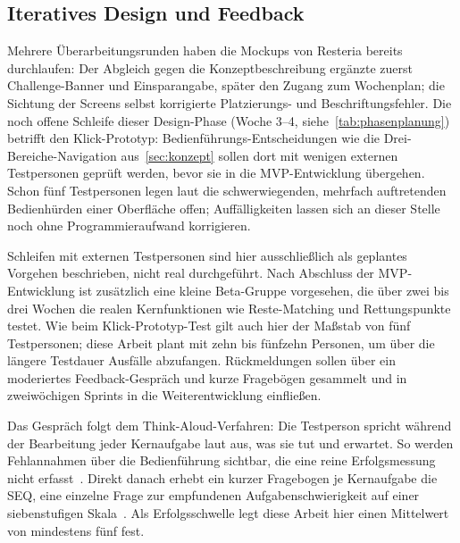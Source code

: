 \subsection{Iteratives Design und Feedback}\label{sec:iteratives_design}

Mehrere Überarbeitungsrunden haben die Mockups von Resteria bereits durchlaufen: Der Abgleich gegen die Konzeptbeschreibung ergänzte zuerst Challenge-Banner und Einsparangabe, später den Zugang zum Wochenplan; die Sichtung der Screens selbst korrigierte Platzierungs- und Beschriftungsfehler. Die noch offene Schleife dieser Design-Phase (Woche 3--4, siehe~\autoref{tab:phasenplanung}) betrifft den Klick-Prototyp: Bedienführungs-Entscheidungen wie die Drei-Bereiche-Navigation aus~\autoref{sec:konzept} sollen dort mit wenigen externen Testpersonen geprüft werden, bevor sie in die \ac{MVP}-Entwicklung übergehen. Schon fünf Testpersonen legen laut \textcite[Kap.~17.2.2]{erlhoferWebsiteKonzeptionUndRelaunch2017} die schwerwiegenden, mehrfach auftretenden Bedienhürden einer Oberfläche offen; Auffälligkeiten lassen sich an dieser Stelle noch ohne Programmieraufwand korrigieren.

Schleifen mit externen Testpersonen sind hier ausschließlich als geplantes Vorgehen beschrieben, nicht real durchgeführt. Nach Abschluss der \ac{MVP}-Entwicklung ist zusätzlich eine kleine Beta-Gruppe vorgesehen, die über zwei bis drei Wochen die realen Kernfunktionen wie Reste-Matching und Rettungspunkte testet. Wie beim Klick-Prototyp-Test gilt auch hier der Maßstab von fünf Testpersonen; diese Arbeit plant mit zehn bis fünfzehn Personen, um über die längere Testdauer Ausfälle abzufangen. Rückmeldungen sollen über ein moderiertes Feedback-Gespräch und kurze Fragebögen gesammelt und in zweiwöchigen Sprints in die Weiterentwicklung einfließen.

Das Gespräch folgt dem Think-Aloud-Verfahren: Die Testperson spricht während der Bearbeitung jeder Kernaufgabe laut aus, was sie tut und erwartet. So werden Fehlannahmen über die Bedienführung sichtbar, die eine reine Erfolgsmessung nicht erfasst~\parencite[Kap.~6.8]{nielsenUsabilityEngineering1993}. Direkt danach erhebt ein kurzer Fragebogen je Kernaufgabe die \ac{SEQ}, eine einzelne Frage zur empfundenen Aufgabenschwierigkeit auf einer siebenstufigen Skala~\parencite[Kap.~8]{sauroLewisQuantifying2016}. Als Erfolgsschwelle legt diese Arbeit hier einen Mittelwert von mindestens fünf fest.
